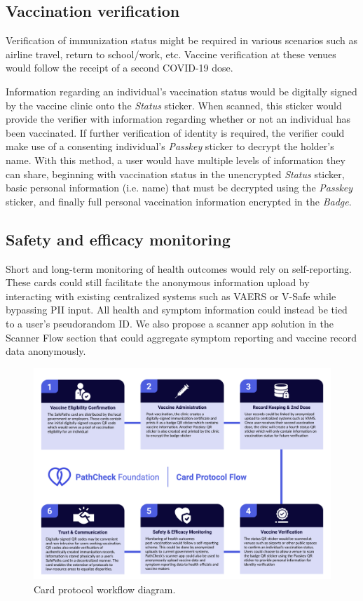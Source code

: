 \subsection{Vaccination verification}
Verification of immunization status might be required in various scenarios such as airline travel, return to school/work, etc. Vaccine verification at these venues would follow the receipt of a second COVID-19 dose. 

Information regarding an individual’s vaccination status would be digitally signed by the vaccine clinic onto the \textit{Status} sticker. When scanned, this sticker would provide the verifier with information regarding whether or not an individual has been vaccinated. If further verification of identity is required, the verifier could make use of a consenting individual’s \textit{Passkey} sticker to decrypt the holder’s name. With this method, a user would have multiple levels of information they can share, beginning with vaccination status in the unencrypted \textit{Status} sticker, basic personal information (i.e. name) that must be decrypted using the \textit{Passkey} sticker, and finally full personal vaccination information encrypted in the \textit{Badge}.  

\subsection{Safety and efficacy monitoring}
Short and long-term monitoring of health outcomes would rely on self-reporting. These cards could still facilitate the anonymous information upload by interacting with existing centralized systems such as VAERS or V-Safe while bypassing PII input. All health and symptom information could instead be tied to a user’s pseudorandom ID. We also propose a scanner app solution in the Scanner Flow section that could aggregate symptom reporting and vaccine record data anonymously.  

\begin{figure}[ht!]
\begin{center}
\includegraphics[width=13.5cm]{images/card_protocol.pdf}
\end{center}
\caption{Card protocol workflow diagram.}
\label{card-protocol}
\end{figure}
